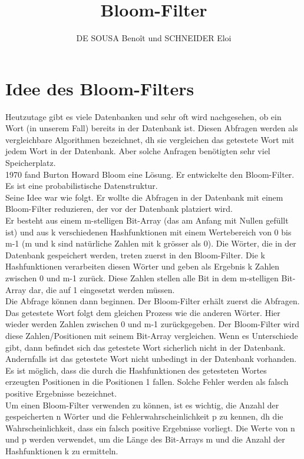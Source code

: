 \documentclass[12pt, letterpaper]{article}
\title{Bloom-Filter}
\author{DE SOUSA Benoît und SCHNEIDER Eloi}
\begin{document}
\maketitle

\section{Idee des Bloom-Filters}
Heutzutage gibt es viele Datenbanken und sehr oft wird nachgesehen, ob ein Wort (in unserem Fall) bereits in der Datenbank ist. Diesen Abfragen werden als vergleichbare Algorithmen bezeichnet, dh sie vergleichen das getestete Wort mit jedem Wort in der Datenbank. Aber solche Anfragen benötigten sehr viel Speicherplatz.\\
1970 fand Burton Howard Bloom eine Lösung. Er entwickelte den Bloom-Filter. Es ist eine probabilistische Datenstruktur.\\
Seine Idee war wie folgt. Er wollte die Abfragen in der Datenbank mit einem Bloom-Filter reduzieren, der vor der Datenbank platziert wird.\\
Er besteht aus einem m-stelligen Bit-Array (das am Anfang mit Nullen gefüllt ist) und aus k verschiedenen Hashfunktionen mit einem Wertebereich von 0 bis m-1 (m und k sind natürliche Zahlen mit k grösser als 0). Die Wörter, die in der Datenbank gespeichert werden, treten zuerst in den Bloom-Filter. Die k Hashfunktionen verarbeiten diesen Wörter und geben als Ergebnis k Zahlen zwischen 0 und m-1 zurück. Diese Zahlen stellen alle Bit in dem m-stelligen Bit-Array dar, die auf 1 eingesetzt werden müssen.\\
Die Abfrage können dann beginnen. Der Bloom-Filter erhält zuerst die Abfragen. Das getestete Wort folgt dem gleichen Prozess wie die anderen Wörter. Hier wieder werden Zahlen zwischen 0 und m-1 zurückgegeben. Der Bloom-Filter wird diese Zahlen/Positionen mit seinem Bit-Array vergleichen. Wenn es Unterschiede gibt, dann befindet sich das getestete Wort sicherlich nicht in der Datenbank. Andernfalls ist das getestete Wort nicht unbedingt in der Datenbank vorhanden. Es ist möglich, dass die durch die Hashfunktionen des getesteten Wortes erzeugten Positionen in die Positionen 1 fallen. Solche Fehler werden als falsch positive Ergebnisse bezeichnet.\\
Um einen Bloom-Filter verwenden zu können, ist es wichtig, die Anzahl der gespeicherten n Wörter und die Fehlerwahrscheinlichkeit p zu kennen, dh die Wahrscheinlichkeit, dass ein falsch positive Ergebnisse vorliegt. Die Werte von n und p werden verwendet, um die Länge des Bit-Arrays m und die Anzahl der Hashfunktionen k zu ermitteln.
\end{document}
